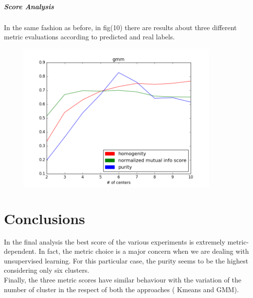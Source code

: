 \documentclass{article}
\begin{document}
				\subsubsection{Score Analysis}
				In the same fashion as before, in fig(10) there are results about three different metric evaluations according to predicted and real labels.
\begin{center}
\begin{figure}
\centering
\includegraphics[width=0.9\textwidth]{figure_19}
\caption{}
\label{fig:10}
\end{figure}
\end{center}
				
\newpage
			\part{Conclusions}
			In the final analysis the best score of the various experiments is extremely metric-dependent.
			In fact, the metric choice is a major concern when we are dealing with unsupervised learning.
			For this particular case,  the purity seems to be the highest considering only six clusters.\\\smallskip
			 Finally, the three metric scores have similar behaviour with the variation of the number of cluster in the respect of both the approaches ( Kmeans and GMM).
		
\end{document}
